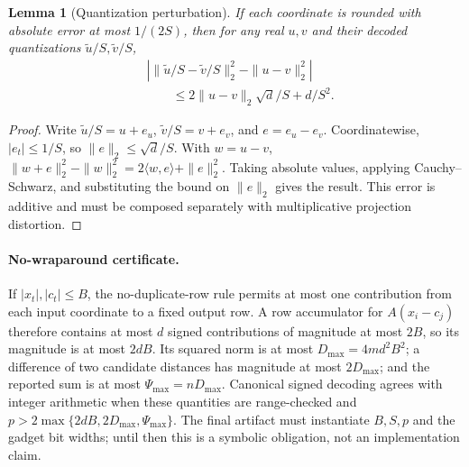 \documentclass[pdflatex,sn-mathphys-num,iicol]{sn-jnl}
\theoremstyle{plain}
\newtheorem{lemma}[theorem]{Lemma}
\theoremstyle{definition}
\theoremstyle{remark}
\begin{document}
\begin{appendices}
\begin{lemma}[Quantization perturbation]\label{lem:quant-a}
If each coordinate is rounded with absolute error at most $1/(2S)$, then for any real $u,v$ and their decoded quantizations $\tilde u/S,\tilde v/S$,
\begin{align*}
&\left|\|\tilde u/S-\tilde v/S\|_2^2-\|u-v\|_2^2\right|\\
&\hspace{2em}\le 2\|u-v\|_2\sqrt d/S+d/S^2.
\end{align*}
\end{lemma}
\begin{proof}
Write $\tilde u/S=u+e_u$, $\tilde v/S=v+e_v$, and $e=e_u-e_v$. Coordinatewise, $|e_t|\le1/S$, so $\|e\|_2\le\sqrt d/S$. With $w=u-v$,
$\|w+e\|_2^2-\|w\|_2^2=2\langle w,e\rangle+\|e\|_2^2$.
Taking absolute values, applying Cauchy--Schwarz, and substituting the bound on $\|e\|_2$ gives the result. This error is additive and must be composed separately with multiplicative projection distortion.
\end{proof}

\paragraph{No-wraparound certificate.} If $|x_t|,|c_t|\le B$, the no-duplicate-row rule permits at most one contribution from each input coordinate to a fixed output row. A row accumulator for $A(x_i-c_j)$ therefore contains at most $d$ signed contributions of magnitude at most $2B$, so its magnitude is at most $2dB$. Its squared norm is at most $D_{\max}=4md^2B^2$; a difference of two candidate distances has magnitude at most $2D_{\max}$; and the reported sum is at most $\Psi_{\max}=nD_{\max}$. Canonical signed decoding agrees with integer arithmetic when these quantities are range-checked and $p>2\max\{2dB,2D_{\max},\Psi_{\max}\}$. The final artifact must instantiate $B,S,p$ and the gadget bit widths; until then this is a symbolic obligation, not an implementation claim.


\end{appendices}
\end{document}
